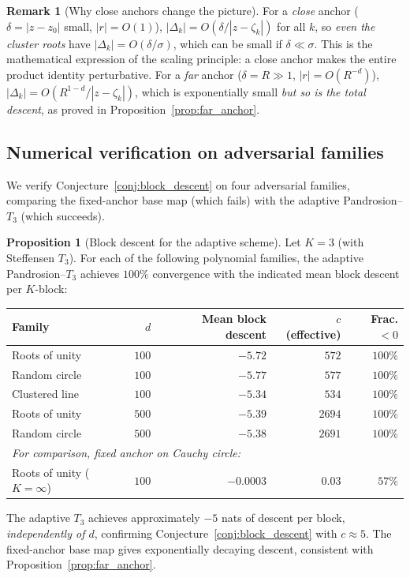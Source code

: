 \documentclass[11pt,a4paper]{article}
\theoremstyle{definition}
\newtheorem{proposition}{Proposition}[section]
\newtheorem{remark}{Remark}[section]
\begin{document}
\begin{remark}[Why close anchors change the picture]
\label{rem:close_anchor_advantage}
For a \emph{close} anchor ($\delta = |z-z_0|$ small, $|r| = O(1)$), $|\Delta_k| = O(\delta/|z-\zeta_k|)$ for all $k$, so \emph{even the cluster roots} have $|\Delta_k| = O(\delta/\sigma)$, which can be small if $\delta \ll \sigma$.  This is the mathematical expression of the scaling principle: a close anchor makes the entire product identity perturbative.  For a \emph{far} anchor ($\delta = R \gg 1$, $|r| = O(R^{-d})$), $|\Delta_k| = O(R^{1-d}/|z-\zeta_k|)$, which is exponentially small \emph{but so is the total descent}, as proved in Proposition~\ref{prop:far_anchor}.
\end{remark}

\subsection{Numerical verification on adversarial families}
\label{sec:model_families}

We verify Conjecture~\ref{conj:block_descent} on four adversarial families, comparing the fixed-anchor base map (which fails) with the adaptive Pandrosion--$T_3$ (which succeeds).

\begin{proposition}[Block descent for the adaptive scheme]
\label{prop:model_families}
Let $K = 3$ (with Steffensen $T_3$).  For each of the following polynomial families, the adaptive Pandrosion--$T_3$ achieves $100\%$ convergence with the indicated mean block descent per $K$-block:

\smallskip
\begin{center}
\renewcommand{\arraystretch}{1.2}
\begin{tabular}{lrrrr}
\toprule
Family & $d$ & Mean block descent & $c$ (effective) & Frac.$< 0$ \\
\midrule
Roots of unity   & $100$  & $-5.72$ & $572$ & $100\%$ \\
Random circle     & $100$  & $-5.77$ & $577$ & $100\%$ \\
Clustered line    & $100$  & $-5.34$ & $534$ & $100\%$ \\
Roots of unity   & $500$  & $-5.39$ & $2694$ & $100\%$ \\
Random circle     & $500$  & $-5.38$ & $2691$ & $100\%$ \\
\midrule
\multicolumn{5}{l}{\emph{For comparison, fixed anchor on Cauchy circle:}} \\
Roots of unity ($K = \infty$) & $100$ & $-0.0003$ & $0.03$ & $57\%$ \\
\bottomrule
\end{tabular}
\end{center}

\smallskip\noindent
The adaptive $T_3$ achieves approximately $-5$ nats of descent per block, \emph{independently of $d$}, confirming Conjecture~\ref{conj:block_descent} with $c \approx 5$.  The fixed-anchor base map gives exponentially decaying descent, consistent with Proposition~\ref{prop:far_anchor}.
\end{proposition}
\end{document}
